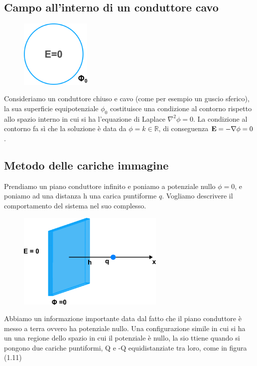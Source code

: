 \subsection{Campo all'interno di un conduttore cavo}

\begin{figure} %
    \centering
    \includegraphics[width=0.3\textwidth]{images/intconduct} %
\end{figure}
Consideriamo un conduttore chiuso e  cavo (come per esempio un guscio sferico), la sua superficie equipotenziale $\phi_0$ costituisce una condizione al contorno rispetto allo spazio interno in cui si ha l'equazione di Laplace $\nabla^2 \phi =0$. 
La condizione al contorno fa s\`i che la soluzione \`e data da $\phi = k \in \mathbb{R}$, di conseguenza $\bold{E} = - \nabla \phi =0$.
  
\subsection{Metodo delle cariche immagine}

Prendiamo un piano conduttore infinito e poniamo a potenziale nullo $\phi = 0$, e poniamo ad una distanza h una carica puntiforme $q$. Vogliamo descrivere il comportamento del sistema nel suo complesso. 
\begin{figure}[!ht]
\vspace{0.1in}
\includegraphics[width = 7cm]{images/chargeplane}	
\centering
\end{figure}

Abbiamo un informazione importante data dal fatto che il piano conduttore \`e messo a terra ovvero ha potenziale nullo. Una configurazione simile in cui si ha un una regione dello spazio in cui il potenziale \`e nullo, la sio ttiene quando si pongono due cariche puntiformi, Q e -Q equidistanziate tra loro, come in figura (1.11)

